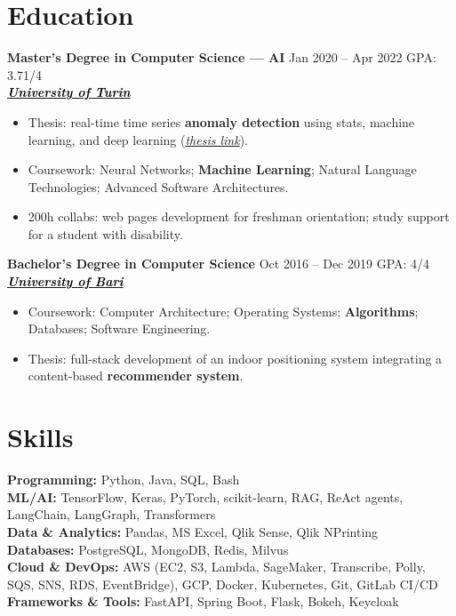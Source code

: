 \documentclass[11pt,a4paper]{article}
\let\OldHref\href
\renewcommand{\href}[2]{\OldHref{#1}{\textit{#2}}}
\begin{document}
	\section*{Education}
	{\small
		
		\textbf{Master’s Degree in Computer Science — AI} \hfill Jan 2020 -- Apr 2022 \hspace{1em} GPA: 3.71/4 \\
		\hfill \href{https://www.unito.it/}{\textbf{\textcolor{black}{University of Turin}}}
		
		\begin{itemize}
			\item Thesis: real-time time series \textbf{anomaly detection} using stats, machine learning, and deep learning (\href{https://unitesi.unito.it/handle/20.500.14240/78909}{thesis link}).
			\item Coursework: Neural Networks; \textbf{Machine Learning}; Natural Language Technologies; Advanced Software Architectures.
			\item 200h collabs: web pages development for freshman orientation; study support for a student with disability.
		\end{itemize}
		
		\textbf{Bachelor’s Degree in Computer Science} \hfill Oct 2016 -- Dec 2019 \hspace{1em} GPA: 4/4 \\
		\hfill \href{https://www.uniba.it/it}{\textbf{\textcolor{black}{University of Bari}}}
		
		\begin{itemize}
			\item Coursework: Computer Architecture; Operating Systems; \textbf{Algorithms}; Databases; Software Engineering.
			\item Thesis: full-stack development of an indoor positioning system integrating a content-based \textbf{recommender system}.
		\end{itemize}
	}
	
	\section*{Skills}
	{\small
		\textbf{Programming:} Python, Java, SQL, Bash \\
		\textbf{ML/AI:} TensorFlow, Keras, PyTorch, scikit-learn, RAG, ReAct agents, LangChain, LangGraph, Transformers \\
		\textbf{Data \& Analytics:} Pandas, MS Excel, Qlik Sense, Qlik NPrinting \\
		\textbf{Databases:} PostgreSQL, MongoDB, Redis, Milvus \\
		\textbf{Cloud \& DevOps:} AWS (EC2, S3, Lambda, SageMaker, Transcribe, Polly, SQS, SNS, RDS, EventBridge), GCP, Docker, Kubernetes, Git, GitLab CI/CD \\
		\textbf{Frameworks \& Tools:} FastAPI, Spring Boot, Flask, Bokeh, Keycloak
	}
	
\end{document}
